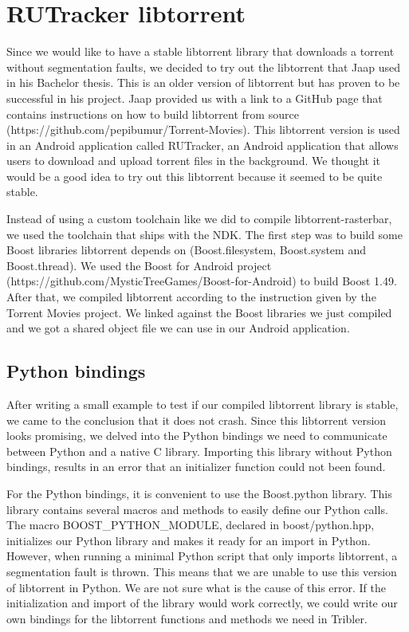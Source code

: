 	\section{RUTracker libtorrent}
		Since we would like to have a stable libtorrent library that downloads a torrent without segmentation faults, we decided to try out the libtorrent that Jaap used in his Bachelor thesis. This is an older version of libtorrent but has proven to be successful in his project. Jaap provided us with a link to a GitHub page that contains instructions on how to build libtorrent from source (https://github.com/pepibumur/Torrent-Movies). This libtorrent version is used in an Android application called RUTracker, an Android application that allows users to download and upload torrent files in the background. We thought it would be a good idea to try out this libtorrent because it seemed to be quite stable.
		
		Instead of using a custom toolchain like we did to compile libtorrent-rasterbar, we used the toolchain that ships with the NDK. The first step was to build some Boost libraries libtorrent depends on (Boost.filesystem, Boost.system and Boost.thread). We used the Boost for Android project (https://github.com/MysticTreeGames/Boost-for-Android) to build Boost 1.49. After that, we compiled libtorrent according to the instruction given by the Torrent Movies project. We linked against the Boost libraries we just compiled and we got a shared object file we can use in our Android application.
		
		\subsection{Python bindings}
			After writing a small example to test if our compiled libtorrent library is stable, we came to the conclusion that it does not crash. Since this libtorrent version looks promising, we delved into the Python bindings we need to communicate between Python and a native C library. Importing this library without Python bindings, results in an error that an initializer function could not been found.
		
			For the Python bindings, it is convenient to use the Boost.python library. This library contains several macros and methods to easily define our Python calls. The macro BOOST\_PYTHON\_MODULE, declared in boost/python.hpp, initializes our Python library and makes it ready for an import in Python. However, when running a minimal Python script that only imports libtorrent, a segmentation fault is thrown. This means that we are unable to use this version of libtorrent in Python. We are not sure what is the cause of this error. If the initialization and import of the library would work correctly, we could write our own bindings for the libtorrent functions and methods we need in Tribler.
			
